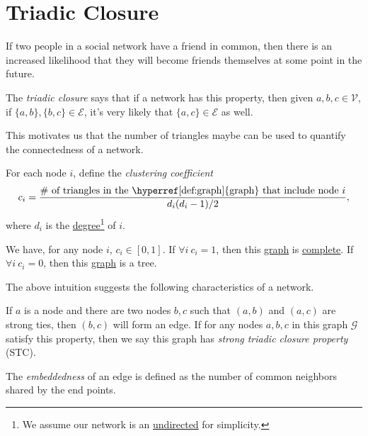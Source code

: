 \section{Triadic Closure}
\begin{intuition}
	If two people in a social network have a friend in common, then there is an increased likelihood that they will become friends themselves at some point in the future.
\end{intuition}

\begin{eg}
	The \emph{triadic closure} says that if a network has this property, then given \(a, b, c\in \mathcal{V}\), if \(\{a, b\}, \{b, c\}\in \mathcal{E} \), it's very likely that \(\{a, c\} \in \mathcal{E} \) as well.
	\begin{center}
	\end{center}
\end{eg}

This motivates us that the number of triangles maybe can be used to quantify the connectedness of a network.

\begin{definition}\label{def:clustering-coefficient}
	For each node \(i\), define the \emph{clustering coefficient}
	\[
		c_{i} = \dfrac{\#\text{ of triangles in the \hyperref[def:graph]{graph} that include node }i}{d_{i}(d_{i}-1) / 2},
	\]
	where \(d_i\) is the \hyperref[def:degree]{degree}\footnote{We assume our network is an \hyperref[def:undirected-graph]{undirected} for simplicity.} of \(i\).
\end{definition}

\begin{remark}
	We have, for any node \(i\), \(c_{i}\in \left[ 0, 1 \right].\) If \(\forall i\ c_{i} = 1\), then this \hyperref[def:graph]{graph} is \hyperref[def:complete-graph]{complete}. If \(\forall i\ c_{i} = 0\), then this \hyperref[def:graph]{graph} is a tree.
\end{remark}

The above intuition suggests the following characteristics of a network.
\begin{definition}\label{def:strong-triadic-closure}
	If \(a\) is a node and there are two nodes \(b, c\) such that \((a, b)\) and \((a, c)\) are strong ties, then \((b, c)\) will form an edge. If for any nodes \(a, b, c\) in this graph \(\mathcal{G}\) satisfy this property, then we say this graph has \emph{strong triadic closure property} (STC).
\end{definition}

\begin{definition}[Embeddedness]\label{def:embeddedness}
	The \emph{embeddedness} of an edge is defined as the number of common neighbors shared by the end points.
\end{definition}